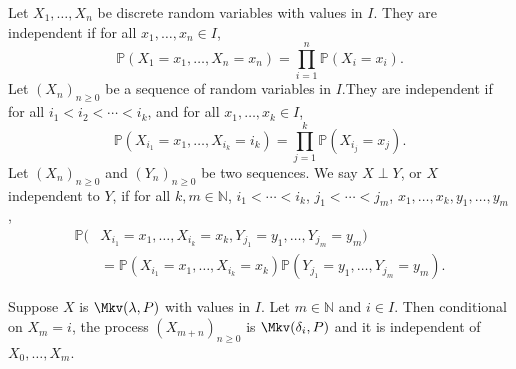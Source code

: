 \documentclass[12pt]{article}
\begin{document}
\begin{definition}
	Let $X_1, \ldots, X_{n}$ be discrete random variables with values in $I$. They are independent if for all $x_1, \ldots, x_n \in I$,
	\[
		\mathbb{P}(X_1 = x_1, \ldots, X_n = x_n) = \prod_{i = 1}^{n} \mathbb{P}(X_i = x_i)
	.\]
	Let $(X_n)_{n \geq 0}$ be a sequence of random variables in $I$.They are independent if for all $i_1 < i_2 < \cdots < i_k$, and for all $x_1, \ldots, x_k \in I$,
	\[
		\mathbb{P}(X_{i_1} = x_1, \ldots, X_{i_k} = i_k) = \prod_{j = 1}^{k} \mathbb{P}(X_{i_j} = x_j)
	.\]
	Let $(X_n)_{n \geq 0}$ and $(Y_n)_{n \geq 0}$ be two sequences. We say $X \perp Y$, or $X$ independent to $Y$, if for all $k, m \in \mathbb{N}$, $i_1 < \cdots < i_k$, $j_1 < \cdots < j_m$, $x_1, \ldots, x_k, y_1, \ldots, y_m$,
	\begin{align*}
		\mathbb{P}(&X_{i_1} = x_1, \ldots, X_{i_k} = x_k, Y_{j_1} = y_1, \ldots, Y_{j_m} = y_m) \\
			   &= \mathbb{P}(X_{i_1} = x_1, \ldots, X_{i_k} = x_k) \mathbb{P}(Y_{j_1} = y_1, \ldots, Y_{j_m} = y_m)
	.\end{align*}
\end{definition}

\begin{theorem}
	Suppose $X$ is $\Mkv(\lambda, P)$ with values in $I$. Let $m \in \mathbb{N}$ and $i \in I$. Then conditional on $X_m = i$, the process $(X_{m+n})_{n \geq 0}$ is $\Mkv(\delta_i, P)$ and it is independent of $X_0, \ldots, X_m$.
\end{theorem}
\end{document}
